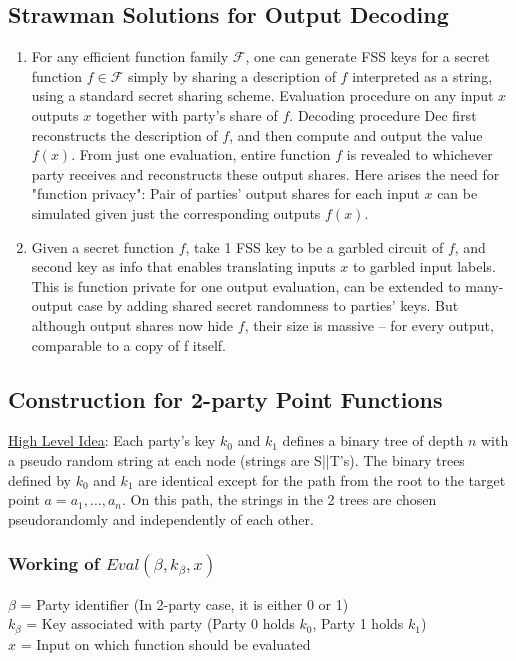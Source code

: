 \subsection{Strawman Solutions for Output Decoding}
\begin{enumerate}
    \item For any efficient function family $\mathcal{F}$, one can generate FSS keys for a secret function $f \in \mathcal{F}$ simply by sharing a description of $f$ interpreted as a string, using a standard secret sharing scheme. Evaluation procedure on any input $x$ outputs $x$ together with party's share of $f$. Decoding procedure Dec first reconstructs the description of $f$, and then compute and output the value $f(x)$. From just one evaluation, entire function $f$ is revealed to whichever party receives and reconstructs these output shares. Here arises the need for "function privacy": Pair of parties' output shares for each input $x$ can be simulated given just the corresponding outputs $f(x)$.
    \item Given a secret function $f$, take 1 FSS key to be a garbled circuit of $f$, and second key as info that enables translating inputs $x$ to garbled input labels. This is function private for one output evaluation, can be extended to many-output case by adding shared secret randomness to parties' keys. But although output shares now hide $f$, their size is massive -- for every output, comparable to a copy of f itself.
\end{enumerate}

\subsection{Construction for 2-party Point Functions}
\underline{High Level Idea}: Each party's key $k_0$ and $k_1$ defines a binary tree of depth $n$ with a pseudo random string at each node (strings are S||T's). The binary trees defined by $k_0$ and $k_1$ are identical except for the path from the root to the target point $a = a_1, ..., a_n$. On this path, the strings in the 2 trees are chosen pseudorandomly and independently of each other.

\subsubsection{Working of $Eval(\beta, k_{\beta}, x)$}
$\beta$ = Party identifier (In 2-party case, it is either 0 or 1) \\
$k_{\beta}$ = Key associated with party (Party 0 holds $k_0$, Party 1 holds $k_1$) \\
$x$ = Input on which function should be evaluated \\

